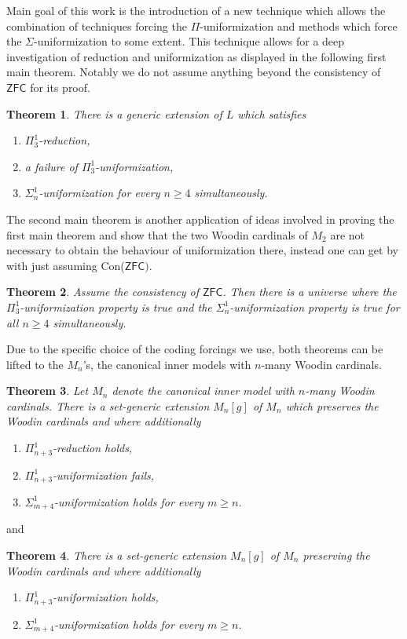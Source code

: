 \documentclass[a4paper,11pt]{article}
\newtheorem{theorem}{Theorem}[section]
\begin{document}
Main goal of this work is the introduction of a new technique which allows the combination of techniques forcing the $\Pi$-uniformization and methods which force the $\Sigma$-uniformization to some extent. This technique allows for a deep investigation of reduction and uniformization as displayed in the following first main theorem. Notably we do not assume anything beyond the consistency of $\mathsf{ZFC}$ for its proof.


\begin{theorem}
There is a generic extension of $L$ which satisfies
\begin{enumerate}
\item $\Pi^1_3$-reduction,
\item a failure of $\Pi^1_3$-uniformization,
\item $\Sigma^1_n$-uniformization for every $n \ge 4$ simultaneously.
\end{enumerate}
\end{theorem}


The second main theorem is another application of ideas involved in proving the first main theorem and show that the two Woodin cardinals of $M_2$ are not necessary to obtain the behaviour of uniformization there, instead one can get by with just assuming Con($\mathsf{ZFC})$.


\begin{theorem}
Assume the consistency of $\mathsf{ZFC}$. Then there is a universe where the $\Pi^1_3$-uniformization property is true and the $\Sigma^1_n$-uniformization property is true for all $n \ge 4$ simultaneously.
\end{theorem}

Due to the specific choice of the coding forcings we use, both theorems can be lifted to the $M_n$'s, the canonical inner models with $n$-many Woodin cardinals. 
\begin{theorem}
    Let $M_n$ denote the canonical inner model with $n$-many Woodin cardinals. There is a set-generic extension $M_n [g]$ of $M_n$ which preserves the Woodin cardinals and where additionally
    \begin{enumerate}
        \item $\Pi^1_{n+3}$-reduction holds,
        \item $\Pi^1_{n+3}$-uniformization fails,
        \item $\Sigma^1_{m+4}$-uniformization holds for every $m \ge n$.
    \end{enumerate}
\end{theorem}
and
\begin{theorem}
    There is a set-generic extension $M_n [g]$ of $M_n$ preserving the Woodin cardinals and where additionally
    \begin{enumerate}
        \item $\Pi^1_{n+3}$-uniformization holds,
        \item $\Sigma^1_{m+4}$-uniformization holds for every $m \ge n$.
    \end{enumerate}
\end{theorem}
\end{document}
